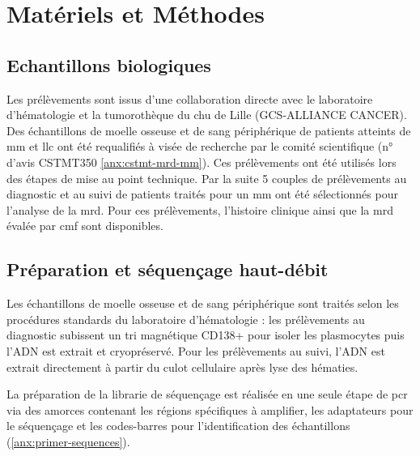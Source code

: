 \chapter{Matériels et Méthodes}

\section{Echantillons biologiques}

Les prélèvements sont issus d'une collaboration directe avec le laboratoire d'hématologie et la tumorothèque du 
\gls{chu} de Lille (GCS-ALLIANCE CANCER). Des échantillons de moelle osseuse et de sang périphérique de patients 
atteints de \gls{mm} et \gls{llc} ont été requalifiés à visée de recherche par le comité scientifique (n° d'avis CSTMT350 \autoref{anx:cstmt-mrd-mm}). 
Ces prélèvements ont été utilisés lors des étapes de mise au point technique. Par la suite 5 couples de prélèvements 
au diagnostic et au suivi de patients traités pour un \gls{mm} ont été sélectionnés pour l'analyse de la \gls{mrd}. Pour ces 
prélèvements, l'histoire clinique ainsi que la \gls{mrd} évalée par \gls{cmf} sont disponibles.

\section{Préparation et séquençage haut-débit}

Les échantillons de moelle osseuse et de sang périphérique sont traités selon les procédures standards du laboratoire 
d'hématologie : les prélèvements au diagnostic subissent un tri magnétique CD138+ pour isoler les plasmocytes puis l'ADN 
est extrait et cryopréservé. Pour les prélèvements au suivi, l'ADN est extrait directement à partir du culot cellulaire 
après lyse des hématies.

\vspace{1em}

La préparation de la librarie de séquençage est réalisée en une seule étape de \gls{pcr} via des amorces contenant les 
régions spécifiques à amplifier, les adaptateurs pour le séquençage et les codes-barres pour l'identification des échantillons 
(\autoref{anx:primer-sequences}).

\vspace{1em}

